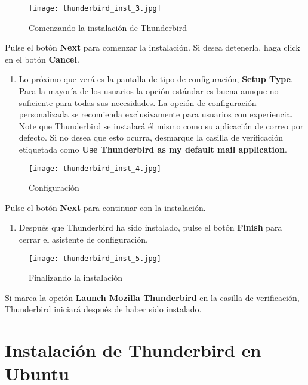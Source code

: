 \documentclass[10pt,a5paper,twoside,,]{book}
\providecommand{\tightlist}{%
  \setlength{\itemsep}{0pt}\setlength{\parskip}{0pt}}
\begin{document}
\begin{figure}[htbp]
\centering
\texttt{[image: thunderbird\_inst\_3.jpg]}
\caption{Comenzando la instalación de Thunderbird}
\end{figure}

Pulse el botón \textbf{Next} para comenzar la instalación. Si desea
detenerla, haga click en el botón \textbf{Cancel}.

\begin{enumerate}
\def\labelenumi{\arabic{enumi}.}
\setcounter{enumi}{4}
\tightlist
\item
  Lo próximo que verá es la pantalla de tipo de configuración,
  \textbf{Setup Type}. Para la mayoría de los usuarios la opción
  estándar es buena aunque no suficiente para todas sus necesidades. La
  opción de configuración personalizada se recomienda exclusivamente
  para usuarios con experiencia. Note que Thunderbird se instalará él
  mismo como su aplicación de correo por defecto. Si no desea que esto
  ocurra, desmarque la casilla de verificación etiquetada como
  \textbf{Use Thunderbird as my default mail application}.
\end{enumerate}

\begin{figure}[htbp]
\centering
\texttt{[image: thunderbird\_inst\_4.jpg]}
\caption{Configuración}
\end{figure}

Pulse el botón \textbf{Next} para continuar con la instalación.

\begin{enumerate}
\def\labelenumi{\arabic{enumi}.}
\setcounter{enumi}{5}
\tightlist
\item
  Después que Thunderbird ha sido instalado, pulse el botón
  \textbf{Finish} para cerrar el asistente de configuración.
\end{enumerate}

\begin{figure}[htbp]
\centering
\texttt{[image: thunderbird\_inst\_5.jpg]}
\caption{Finalizando la instalación}
\end{figure}

Si marca la opción \textbf{Launch Mozilla Thunderbird} en la casilla de
verificación, Thunderbird iniciará después de haber sido instalado.

\section{Instalación de Thunderbird en
Ubuntu}\label{instalaciuxf3n-de-thunderbird-en-ubuntu}
\end{document}
